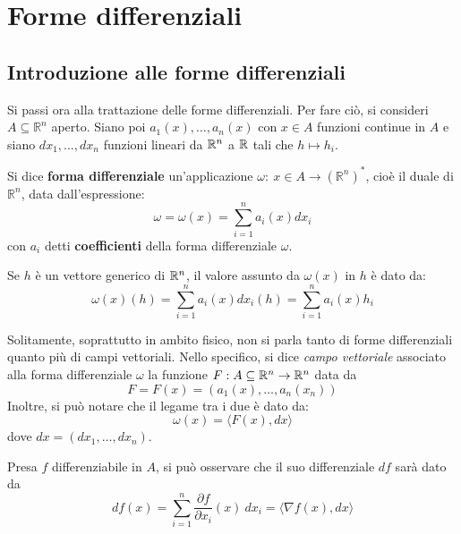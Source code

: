 \chapter{Forme differenziali}
\section{Introduzione alle forme differenziali}
Si passi ora alla trattazione delle forme differenziali.
Per fare ciò, si consideri $A \subseteq \mathbb{R}^n$ aperto. Siano poi $a_1(x), \dots, a_n(x)$ con $x \in A$ funzioni continue in $A$ e siano $dx_1, \dots, dx_n$ funzioni lineari da $\mathbb{R}^n$ a $\mathbb{R}$ tali che $h \mapsto h_i$.
\begin{definition} \label{Def: Forma differenziale}
Si dice \textbf{forma differenziale} un'applicazione $\omega:\ x \in A \to  (\mathbb{R}^n)^*$, cioè il duale di $\mathbb{R}^n$, data dall'espressione:
\begin{equation*}
    \omega= \omega(x)= \sum\limits_{i=1}^{n}{a_i(x)dx_i}
\end{equation*}
con $a_i$ detti \textbf{coefficienti} della forma differenziale $\omega$.
\end{definition}
\begin{oss}
    Se $h$ è un vettore generico di $\mathbb{R}^n$, il valore assunto da $\omega(x)$ in $h$ è dato da:
    \begin{equation*}
        \omega(x)(h)=\sum\limits_{i=1}^{n}{a_i(x)dx_i(h)}= \sum\limits_{i=1}^{n}{a_i(x)h_i}
    \end{equation*}
\end{oss}
\begin{oss}
Solitamente, soprattutto in ambito fisico, non si parla tanto di forme differenziali quanto più di campi vettoriali. Nello specifico, si dice \textit{campo vettoriale} associato alla forma differenziale $\omega$ la funzione $F: A\subseteq \mathbb{R}^n \to \mathbb{R}^n$ data da
\begin{equation*}
    F=F(x)=(a_1(x), \dots, a_n(x_n))
\end{equation*}
Inoltre, si può notare che il legame tra i due è dato da:
\begin{equation} \label{Eq: Campo vettoriale}
    \omega(x)= \langle F(x), dx \rangle
\end{equation}
dove $dx= (dx_1,\dots, dx_n)$.
\end{oss}
\begin{oss}
Presa $f$ differenziabile in $A$, si può osservare che il suo differenziale $df$ sarà dato da
\begin{equation} \label{Eq: Differenziale}
    df(x)= \sum\limits_{i=1}^{n}{\frac{\partial f}{\partial x_i}(x)\ dx_i}= \langle \nabla f(x), dx\rangle
\end{equation}
\end{oss}
